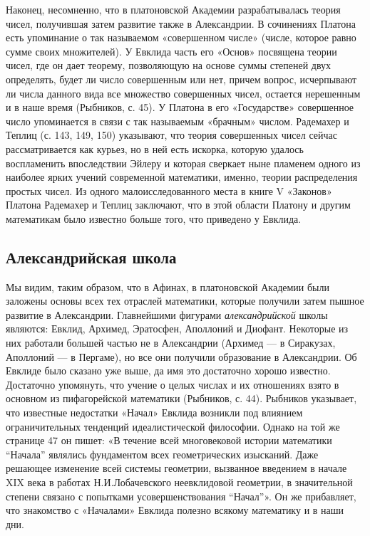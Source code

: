 Наконец, несомненно, что в платоновской Академии разрабатывалась
теория чисел, получившая затем развитие также в Александрии. В
сочинениях Платона есть упоминание о так называемом «совершенном
числе» (числе, которое равно сумме своих множителей). У Евклида часть
его «Основ» посвящена теории чисел, где он дает теорему, позволяющую
на основе суммы степеней двух определять, будет ли число совершенным
или нет, причем вопрос, исчерпывают ли числа данного вида все
множество совершенных чисел, остается нерешенным и в наше время
(Рыбников, с. 45). У Платона в его «Государстве» совершенное число
упоминается в связи с так называемым «брачным» числом. Радемахер и
Теплиц (с. 143, 149, 150) указывают, что теория совершенных чисел
сейчас рассматривается как курьез, но в ней есть искорка, которую
удалось воспламенить впоследствии Эйлеру и которая сверкает ныне
пламенем одного из наиболее ярких учений современной математики,
именно, теории распределения простых чисел. Из одного
малоисследованного места в книге V «Законов» Платона Радемахер и
Теплиц заключают, что в этой области Платону и другим математикам было
известно больше того, что приведено у Евклида.

\subsection{Александрийская школа}

Мы видим, таким образом, что в Афинах, в платоновской Академии были
заложены основы всех тех отраслей математики, которые получили затем
пышное развитие в Александрии. Главнейшими фигурами
\emph{александрийской} школы являются: Евклид, Архимед, Эратосфен,
Аполлоний и Диофант. Некоторые из них работали большей частью не в
Александрии (Архимед --- в Сиракузах, Аполлоний --- в Пергаме), но все
они получили образование в Александрии. Об Евклиде было сказано уже
выше, да имя это достаточно хорошо известно. Достаточно упомянуть, что
учение о целых числах и их отношениях взято в основном из
пифагорейской математики (Рыбников, с. 44). Рыбников указывает, что
известные недостатки «Начал» Евклида возникли под влиянием
ограничительных тенденций идеалистической философии. Однако на той же
странице 47 он пишет: «В течение всей многовековой истории математики
``Начала'' являлись фундаментом всех геометрических изысканий. Даже
решающее изменение всей системы геометрии, вызванное введением в
начале XIX века в работах Н.И.Лобачевского неевклидовой геометрии, в
значительной степени связано с попытками усовершенствования
``Начал''». Он же прибавляет, что знакомство с «Началами» Евклида
полезно всякому математику и в наши дни.

